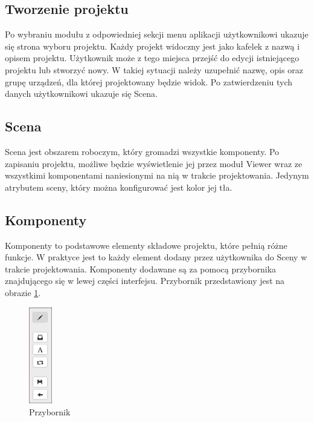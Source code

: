 \subsection{Tworzenie projektu}

Po wybraniu modułu z odpowiedniej sekcji menu aplikacji użytkownikowi ukazuje się strona wyboru projektu. Każdy projekt widoczny jest jako kafelek z nazwą i opisem projektu. Użytkownik może z tego miejsca przejść do edycji istniejącego projektu lub stworzyć nowy. W takiej sytuacji należy uzupełnić nazwę, opis oraz grupę urządzeń, dla której projektowany będzie widok. Po zatwierdzeniu tych danych użytkownikowi ukazuje się Scena.


\subsection{Scena}
Scena jest obszarem roboczym, który gromadzi wszystkie komponenty. Po zapisaniu projektu, możliwe będzie wyświetlenie jej przez moduł Viewer wraz ze wszystkimi komponentami naniesionymi na nią w trakcie projektowania. Jedynym atrybutem sceny, który można konfigurować jest kolor jej tła.

\subsection{Komponenty}
Komponenty to podstawowe elementy składowe projektu, które pełnią różne funkcje. W praktyce jest to każdy element dodany przez użytkownika do Sceny w trakcie projektowania. Komponenty dodawane są za pomocą przybornika znajdującego się w lewej części interfejsu. Przybornik przedstawiony jest na obrazie \ref{fig:toolbox}. 

\begin{figure}[h]
\centerline{
	\includegraphics[width=10mm]{./img/screen/designer_przybornik.png}
	}
	\caption{Przybornik}
	\label{fig:toolbox}
\end{figure}


